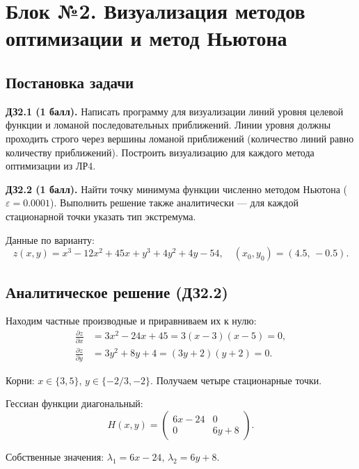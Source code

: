 \section{Блок №2. Визуализация методов оптимизации и метод Ньютона}

\subsection{Постановка задачи}

\textbf{ДЗ2.1 (1 балл).} Написать программу для визуализации линий уровня целевой функции и ломаной последовательных приближений. Линии уровня должны проходить строго через вершины ломаной приближений (количество линий равно количеству приближений). Построить визуализацию для каждого метода оптимизации из ЛР4.

\textbf{ДЗ2.2 (1 балл).} Найти точку минимума функции численно методом Ньютона ($\varepsilon = 0.0001$). Выполнить решение также аналитически --- для каждой стационарной точки указать тип экстремума.

Данные по варианту:
\begin{equation}\label{eq:func2}
    z(x, y) = x^3 - 12x^2 + 45x + y^3 + 4y^2 + 4y - 54, \quad (x_0, y_0) = (4.5,\, -0.5).
\end{equation}

\subsection{Аналитическое решение (ДЗ2.2)}

Находим частные производные и приравниваем их к нулю:
\begin{align}
    \frac{\partial z}{\partial x} &= 3x^2 - 24x + 45 = 3(x - 3)(x - 5) = 0, \\
    \frac{\partial z}{\partial y} &= 3y^2 + 8y + 4 = (3y + 2)(y + 2) = 0.
\end{align}

Корни: $x \in \{3, 5\}$, $y \in \{-2/3, -2\}$. Получаем четыре стационарные точки.

Гессиан функции диагональный:
\begin{equation}
    H(x, y) = \begin{pmatrix}
        6x - 24 & 0 \\
        0 & 6y + 8
    \end{pmatrix}.
\end{equation}

Собственные значения: $\lambda_1 = 6x - 24$, $\lambda_2 = 6y + 8$.

